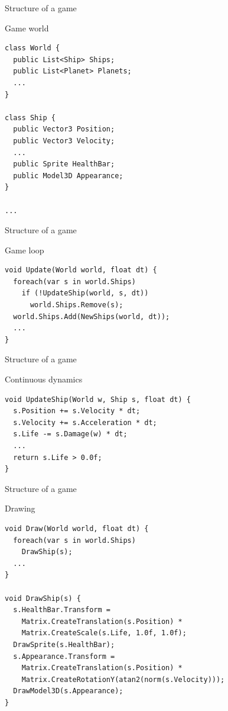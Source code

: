 \documentclass{beamer}
\begin{document}
\begin{frame}[fragile]{Structure of a game}
\begin{block}{Game world}
\begin{lstlisting}
class World {
  public List<Ship> Ships;
  public List<Planet> Planets;
  ...
}

class Ship {
  public Vector3 Position;
  public Vector3 Velocity;
  ...
  public Sprite HealthBar;
  public Model3D Appearance;
}

...
\end{lstlisting}
\end{block}
\end{frame}

\begin{frame}[fragile]{Structure of a game}
\begin{block}{Game loop}
\begin{lstlisting}
void Update(World world, float dt) {
  foreach(var s in world.Ships)
    if (!UpdateShip(world, s, dt))
      world.Ships.Remove(s);
  world.Ships.Add(NewShips(world, dt));
  ...
}
\end{lstlisting}
\end{block}
\end{frame}

\begin{frame}[fragile]{Structure of a game}
\begin{block}{Continuous dynamics}
\begin{lstlisting}
void UpdateShip(World w, Ship s, float dt) {
  s.Position += s.Velocity * dt;
  s.Velocity += s.Acceleration * dt;
  s.Life -= s.Damage(w) * dt;
  ...
  return s.Life > 0.0f;
}
\end{lstlisting}
\end{block}
\end{frame}

\begin{frame}[fragile]{Structure of a game}
\begin{block}{Drawing}
\begin{lstlisting}
void Draw(World world, float dt) {
  foreach(var s in world.Ships)
    DrawShip(s);
  ...
}

void DrawShip(s) {
  s.HealthBar.Transform = 
    Matrix.CreateTranslation(s.Position) *
    Matrix.CreateScale(s.Life, 1.0f, 1.0f);
  DrawSprite(s.HealthBar);
  s.Appearance.Transform = 
    Matrix.CreateTranslation(s.Position) *
    Matrix.CreateRotationY(atan2(norm(s.Velocity)));
  DrawModel3D(s.Appearance);
}
\end{lstlisting}
\end{block}
\end{frame}
\end{document}

